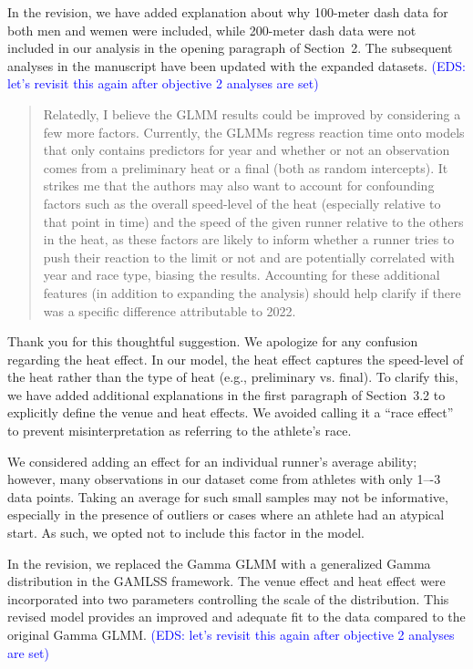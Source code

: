 \documentclass[12pt]{article}
\newcommand{\eds}[1]{\textcolor{blue}{(EDS: #1)}}
\newenvironment{comment}%
{\begin{quotation}\noindent\small\it\color{darkblue}\ignorespaces%
}{\end{quotation}}
\begin{document}
In the revision, we have added explanation about why 100-meter dash
data for both men and wemen were included, while 200-meter dash data
were not included in our analysis in the opening paragraph of Section~2.
The subsequent analyses in the manuscript have been updated with the
expanded datasets.
\eds{let's revisit this again after objective 2 analyses are set}


\begin{comment}
Relatedly, I believe the GLMM results could be improved by considering a few
more factors. Currently, the GLMMs regress reaction time onto models that only
contains predictors for year and whether or not an observation comes from a
preliminary heat or a final (both as random intercepts). It strikes me that the
authors may also want to account for confounding factors such as the overall
speed-level of the heat (especially relative to that point in time) and the
speed of the given runner relative to the others in the heat, as these factors
are likely to inform whether a runner tries to push their reaction to the limit
or not and are potentially correlated with year and race type, biasing the
results. Accounting for these additional features (in addition to expanding the
analysis) should help clarify if there was a specific difference attributable to
2022.
\end{comment}


Thank you for this thoughtful suggestion. We apologize for any
confusion regarding the heat effect. In our model, the heat effect
captures the speed-level of the heat rather than the type of heat
(e.g., preliminary vs. final). To clarify this, we have added
additional explanations in the first paragraph of Section~3.2 to
explicitly define the venue and heat effects. We avoided calling it a
``race effect'' to prevent misinterpretation as referring to the
athlete's race.


We considered adding an effect for an individual runner’s average
ability; however, many observations in our dataset come from athletes
with only 1–-3 data points. Taking an average for such small samples
may not be informative, especially in the presence of outliers or
cases where an athlete had an atypical start. As such, we opted not to
include this factor in the model.


In the revision, we replaced the Gamma GLMM with a generalized Gamma
distribution in the GAMLSS framework. The venue effect and heat effect
were incorporated into two parameters controlling the scale of the
distribution. This revised model provides an improved and adequate fit
to the data compared to the original Gamma GLMM.
\eds{let's revisit this again after objective 2 analyses are set}
\end{document}
